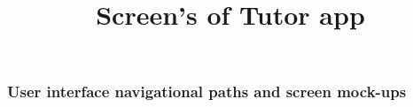 \documentclass[12pt]{article}
\begin{document}


 \subsubsection{User interface navigational paths and screen mock-ups}
 \begin{flushleft}
 \title{Screen's of Tutor app}\\
 \end{flushleft}
 
\end{document}
